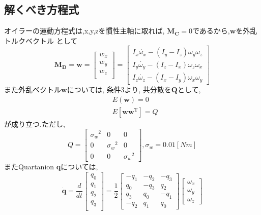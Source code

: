 \documentclass[class=article, crop=false, dvipdfmx, fleqn]{standalone}
\begin{document}
\subsection{解くべき方程式}
オイラーの運動方程式は,x,y,zを慣性主軸に取れば, $\bm{M_C}=0$であるから,$\bm{w}$を外乱トルクベクトル
として
\begin{equation}
  \bm{M_D} = \bm{w}
  =
  \begin{bmatrix}
    w_x \\
    w_y \\
    w_z \\
  \end{bmatrix}
  =
  \begin{bmatrix}
    I_x\dot{\omega_x} - (I_y - I_z)\omega_y \omega_z \\
    I_y\dot{\omega_y} - (I_z - I_x)\omega_z \omega_x \\
    I_z\dot{\omega_z} - (I_x - I_y)\omega_x \omega_y
  \end{bmatrix}
\end{equation}
また外乱ベクトル$\bm{w}$については, 条件3より, 共分散を$\bm{Q}$として,
\begin{align}
   & E(\bm{w}) = 0 \\
   & E[\bm{w}{\bm{w}}^{\mathrm{T}}] = Q
\end{align}
が成り立つ.ただし,
\begin{equation}
   Q =
  \begin{bmatrix}
    {\sigma_w}^2 & 0 & 0 \\
    0 & {\sigma_w}^2 & 0 \\
    0 & 0 & {\sigma_w}^2
  \end{bmatrix}
  ,  {\sigma_w} = 0.01[Nm]
\end{equation}
またQuartanion $\bm{q}$については,
\begin{equation}
  \dot{\bm{q}} = \frac{d}{dt}
  \begin{bmatrix}
    q_0 \\
    q_1 \\
    q_2 \\
    q_3 \\
  \end{bmatrix}
  = \frac{1}{2}
  \begin{bmatrix}
    -q_1 & -q_2 & -q_3 \\
    q_0 & -q_3 & q_2 \\
    q_3 & q_0 & -q_1 \\
    -q_2 & q_1 & q_0
  \end{bmatrix}
  \begin{bmatrix}
    \omega_x \\
    \omega_y \\
    \omega_z
  \end{bmatrix}
\end{equation}
\end{document}
